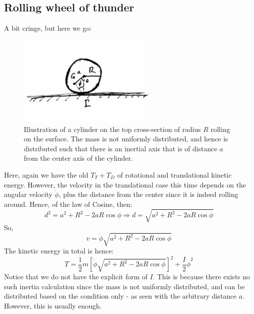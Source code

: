 \subsection{Rolling wheel of thunder}
A bit cringe, but here we go:
\begin{figure}[htb]
    \centering
    \includegraphics[width=0.6\textwidth]{img/c5_rolling.jpg}
    \caption{Illustration of a cylinder on the top cross-section of radius $R$ rolling on the surface. The mass is not uniformly distributed, and hence is distributed such that there is an inertial axis that is of distance $a$ from the center axis of the cylinder.}
\end{figure}
Here, again we have the old $T_{T}+T_{D}$ of rotational and translational kinetic energy. However, the velocity in the translational case this time depends on the angular velocity $\dot{\phi}$, plus the distance from the center since it is indeed rolling around. Hence, of the law of Cosine, then:
\begin{equation}
    d^{2} = a^{2} + R^{2} - 2aR \cos{\phi} \Rightarrow d = \sqrt{a^{2} + R^{2} - 2aR \cos{\phi}} 
\end{equation}
So, 
\begin{equation}
    v = \dot{\phi}\sqrt{a^{2} + R^{2} - 2aR \cos{\phi}}
\end{equation}
The kinetic energy in total is hence:
\begin{equation}
    T = \frac{1}{2}m \left[\dot{\phi}\sqrt{a^{2} + R^{2} - 2aR \cos{\phi}}\right]^{2} + \frac{I}{2}\dot{\phi}^{2}
\end{equation}
Notice that we do not have the explicit form of $I$. This is because there exists no such inertia calculation since the mass is not uniformly distributed, and can be distributed based on the condition only - as seen with the arbitrary distance $a$. However, this is usually enough. 
